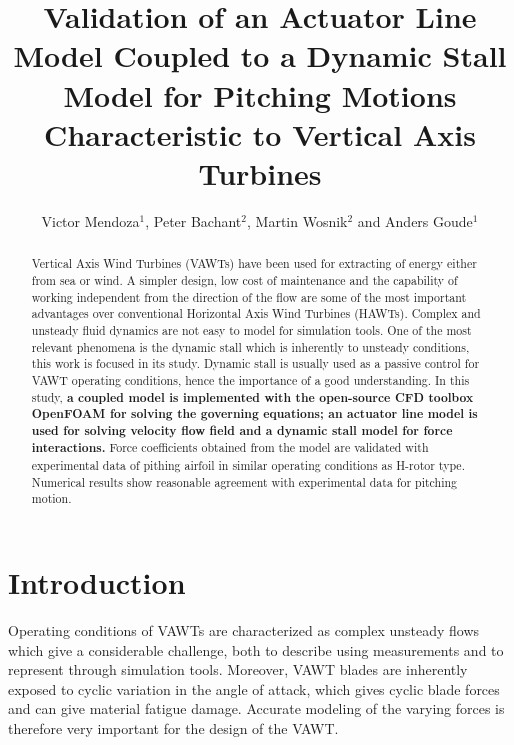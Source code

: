 \documentclass[a4paper]{jpconf}
\begin{document}
\title{Validation of an Actuator Line Model Coupled to a Dynamic Stall Model for
Pitching Motions Characteristic to Vertical Axis Turbines}


\author{Victor Mendoza$^{1}$, Peter Bachant$^{2}$, Martin Wosnik$^{2}$ and Anders Goude$^{1}$ }
\address{$^{1}$ Department of Engineering Sciences, Division of Electricity, Uppsala University, \\Uppsala 751 21, Sweden}
\address{$^{2}$ Center for Ocean Renewable Energy, University of New Hampshire, 24 Colovos Rd.,\\ Durham, NH 03824, USA}


\begin{abstract}

    Vertical Axis Wind Turbines (VAWTs) have been used for extracting of energy
    either from sea or wind. A simpler design, low cost of maintenance and the
    capability of working independent from the direction of the flow are some of
    the most important advantages over conventional Horizontal Axis Wind
    Turbines (HAWTs). Complex and unsteady fluid dynamics are not easy to model
    for simulation tools. One of the most relevant phenomena is the dynamic
    stall which is inherently to unsteady conditions, this work is focused in
    its study. Dynamic stall is usually used as a passive control for VAWT
    operating conditions, hence the importance of a good understanding. In this
    study, \textbf{a coupled model is implemented with the open-source CFD
    toolbox OpenFOAM for solving the governing equations; an actuator line model
    is used for solving velocity flow field and a dynamic stall model for force
    interactions.} Force coefficients obtained from the model are validated with
    experimental data of pithing airfoil in similar operating conditions as
    H-rotor type. Numerical results show reasonable agreement with experimental
    data for pitching motion. 

\end{abstract}


\section{Introduction}

Operating conditions of VAWTs are characterized as complex unsteady flows which
give a considerable challenge, both to describe using measurements and to
represent through simulation tools\cite{huyer1996unsteady}. Moreover, VAWT
blades are inherently exposed to cyclic variation in the angle of attack, which
gives cyclic blade forces and can give material fatigue damage. Accurate
modeling of the varying forces is therefore very important for the design of the
VAWT.
\end{document}
